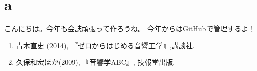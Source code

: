 \documentclass[10pt,b5paper,papersize,dvipdfmx]{jsbook}
\begin{document}
\section{a}
こんにちは。今年も会誌頑張って作ろうね。
今年からはGitHubで管理するよ！


\sanko
\begin{enumerate}
  \item 青木直史 (2014), 『ゼロからはじめる音響工学』,講談社.
  \item 久保和宏ほか(2009), 『音響学ABC』, 技報堂出版.
\end{enumerate}
\end{document}
